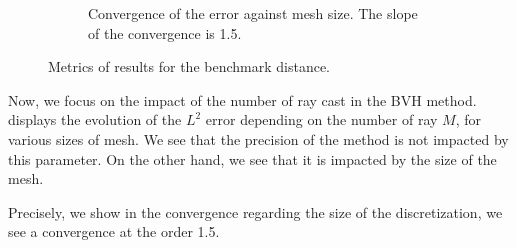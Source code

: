 \begin{figure}
\begin{subfigure}{0.49\textwidth}
    \caption{Convergence of the error against mesh size. The slope of the convergence is 1.5.}
    \label{fig:app:feelpp-distance:results:h}
  \end{subfigure}
  \caption{Metrics of results for the benchmark distance.}
  \label{fig:app:feelpp-distance:results}
\end{figure}

Now, we focus on the impact of the number of ray cast in the BVH method.
 displays the evolution of the $L^2$ error depending on the number of ray $M$, for various sizes of mesh.
We see that the precision of the method is not impacted by this parameter.
On the other hand, we see that it is impacted by the size of the mesh.

Precisely, we show in  the convergence regarding the size of the discretization, we see a convergence at the order 1.5.